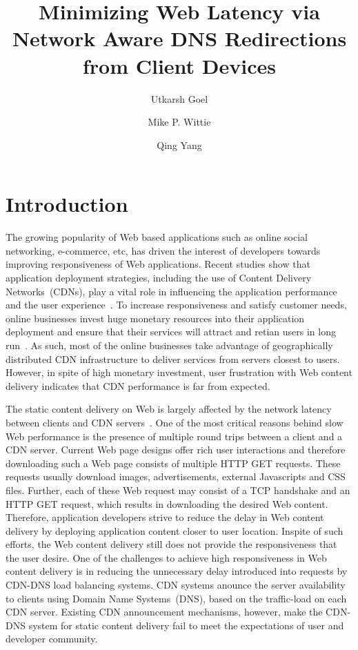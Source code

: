 \documentclass{llncs}
\title{Minimizing Web Latency via Network Aware DNS Redirections from Client Devices}
\author{Utkarsh Goel \and Mike P. Wittie \and Qing Yang}
\institute{Department of Computer Science,\\
Montana State University, Bozeman MT 59715,\\
\email{\{utkarsh.goel, mwittie, qing.yang\}@cs.montana.edu}
}
\begin{document}
\maketitle

\begin{abstract}

\end{abstract}


\section{Introduction}


The growing popularity of Web based applications such as online social networking, e-commerce, etc, has driven the interest of developers towards improving responsiveness of Web applications.
Recent studies show that application deployment strategies, including the use of Content Delivery Networks~(CDNs), play a vital role in influencing the application performance and the user experience~\cite{cdnbenefitsRackspace}\cite{cdnbenefitsCdnnetworks}.
To increase responsiveness and satisfy customer needs, online businesses invest huge monetary resources into their application deployment and ensure that their services will attract and retian users in long run~\cite{oreilly:businessloss}\cite{server:queue}\cite{blogspot:marissa}\cite{tabb:businessloss}.
As such, most of the online businesses take advantage of geographically distributed CDN infrastructure to deliver services from servers closest to users.
However, in spite of high monetary investment, user frustration with Web content delivery indicates that CDN performance is far from expected.



The static content delivery on Web is largely affected by the network latency between clients and CDN servers~\cite{GoelAppPerfSurvey}\cite{doc:latency}\cite{igvita:latency}.
One of the most critical reasons behind slow Web performance is the presence of multiple round trips between a client and a CDN server.
Current Web page designs offer rich user interactions and therefore downloading such a Web page consists of multiple HTTP GET requests.
These requests usually download images, advertisements, external Javascripts and CSS files.
Further, each of these Web request may consist of a TCP handshake and an HTTP GET request, which results in downloading the desired Web content.
Therefore, application developers strive to reduce the delay in Web content delivery by deploying application content closer to user location.
Inspite of such efforts, the Web content delivery still does not provide the responsiveness that the user desire.
One of the challenges to achieve high responsiveness in Web content delivery is in reducing the unnecessary delay introduced into requests by CDN-DNS load balancing systems. 
CDN systems anounce the server availability to clients using Domain Name Systems~(DNS), based on the traffic-load on each CDN server. 
Existing CDN announcement mechanisms, however, make the CDN-DNS system for static content delivery fail to meet the expectations of user and developer community.
\end{document}
